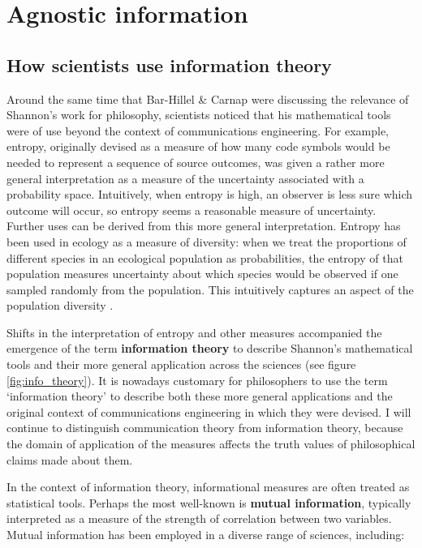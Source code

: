 \section{Agnostic information}\label{sec:agnostic}

\subsection{How scientists use information theory}\label{subsec:scientists}

Around the same time that Bar-Hillel \& Carnap were discussing the relevance of Shannon's work for philosophy, scientists noticed that his mathematical tools were of use beyond the context of communications engineering.
For example, entropy, originally devised as a measure of how many code symbols would be needed to represent a sequence of source outcomes, was given a rather more general interpretation as a measure of the uncertainty associated with a probability space.
Intuitively, when entropy is high, an observer is less sure which outcome will occur, so entropy seems a reasonable measure of uncertainty.
Further uses can be derived from this more general interpretation.
Entropy has been used in ecology as a measure of diversity: when we treat the proportions of different species in an ecological population as probabilities, the entropy of that population measures uncertainty about which species would be observed if one sampled randomly from the population.
This intuitively captures an aspect of the population diversity \citep{margalef1957information}.

Shifts in the interpretation of entropy and other measures accompanied the emergence of the term \textbf{information theory} to describe Shannon's mathematical tools and their more general application across the sciences (see figure \ref{fig:info_theory}).
It is nowadays customary for philosophers to use the term `information theory' to describe both these more general applications and the original context of communications engineering in which they were devised.
I will continue to distinguish communication theory from information theory, because the domain of application of the measures affects the truth values of philosophical claims made about them. %



In the context of information theory, informational measures are often treated as statistical tools.
Perhaps the most well-known is \textbf{mutual information}, typically interpreted as a measure of the strength of correlation between two variables.
Mutual information has been employed in a diverse range of sciences, including:

